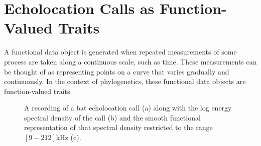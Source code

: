 \documentclass{ws-rv9x6}
\begin{document}
\section{Echolocation Calls as Function-Valued Traits}
\label{sec:funrep}
A functional data object is generated when repeated measurements of some process are taken along a continuous scale, such as time. \cite{ramsay2006functional} 
These measurements can be thought of as representing points on a curve that varies gradually and continuously. In the context of phylogenetics, these functional data objects are function-valued traits. \cite{meyer2005up}

\begin{figure}
	\centering
	\caption{A recording of a bat echolocation call (a) along with the log energy spectral density of the call (b) and the smooth functional representation of that spectral density restricted to the range \([9-212]\)kHz (c).}
\end{figure}
\end{document}
